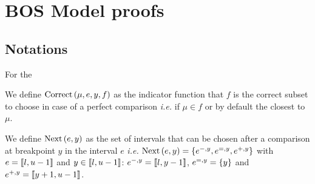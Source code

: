 \section{BOS Model proofs}
\label{appendix:bos_proofs}

\subsection{Notations}

For the 

\begin{definition}
    We define $\text{Correct}\left(\mu, e, y, f\right)$ as the indicator function that $f$ is the correct subset to choose in case of a perfect comparison \textit{i.e.} if $\mu \in f$ or by default the closest to $\mu$.
\end{definition}

\begin{definition}
    We define $\text{Next}\left(e, y\right)$ as the set of intervals that can be chosen after a comparison at breakpoint $y$ in the interval $e$ \textit{i.e.} $\text{Next}\left(e, y\right) = \left\{ e^{-,y}, e^{=,y}, e^{+,y} \right\}$ with $e = \left\llbracket l, u - 1\right\rrbracket$ and $y \in \left\llbracket l, u - 1\right\rrbracket$: $e^{-,y} = \left\llbracket l, y - 1\right\rrbracket$, $e^{=,y} = \left\{ y \right\}$ and $e^{+,y} = \left\llbracket y + 1, u - 1\right\rrbracket$.
\end{definition}

